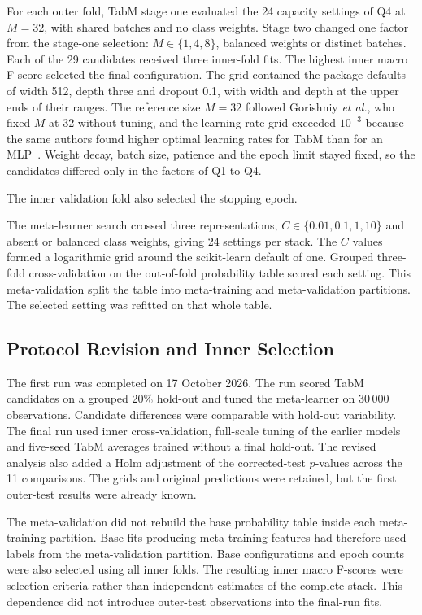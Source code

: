 \documentclass[conference]{IEEEtran}
\begin{document}
For each outer fold, TabM stage one evaluated the 24 capacity settings of Q4 at $M=32$, with shared batches and no class weights. Stage two changed one factor from the stage-one selection: $M\in\{1,4,8\}$, balanced weights or distinct batches. Each of the 29 candidates received three inner-fold fits. The highest inner macro F-score selected the final configuration. The grid contained the package defaults of width 512, depth three and dropout 0.1, with width and depth at the upper ends of their ranges. The reference size $M=32$ followed Gorishniy \emph{et al.}, who fixed $M$ at 32 without tuning, and the learning-rate grid exceeded $10^{-3}$ because the same authors found higher optimal learning rates for TabM than for an MLP~\cite{gorishniy2025}. Weight decay, batch size, patience and the epoch limit stayed fixed, so the candidates differed only in the factors of Q1 to Q4.

The inner validation fold also selected the stopping epoch.

The meta-learner search crossed three representations, $C\in\{0.01,0.1,1,10\}$ and absent or balanced class weights, giving 24 settings per stack. The $C$ values formed a logarithmic grid around the scikit-learn default of one. Grouped three-fold cross-validation on the out-of-fold probability table scored each setting. This meta-validation split the table into meta-training and meta-validation partitions. The selected setting was refitted on that whole table.

\subsection{Protocol Revision and Inner Selection}
The first run was completed on 17 October 2026. The run scored TabM candidates on a grouped 20\% hold-out and tuned the meta-learner on 30\,000 observations. Candidate differences were comparable with hold-out variability. The final run used inner cross-validation, full-scale tuning of the earlier models and five-seed TabM averages trained without a final hold-out. The revised analysis also added a Holm adjustment of the corrected-test $p$-values across the 11 comparisons. The grids and original predictions were retained, but the first outer-test results were already known.

The meta-validation did not rebuild the base probability table inside each meta-training partition. Base fits producing meta-training features had therefore used labels from the meta-validation partition. Base configurations and epoch counts were also selected using all inner folds. The resulting inner macro F-scores were selection criteria rather than independent estimates of the complete stack. This dependence did not introduce outer-test observations into the final-run fits.
\end{document}

